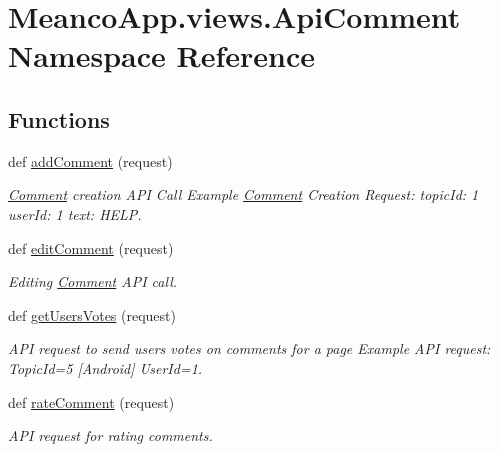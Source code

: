 \hypertarget{namespace_meanco_app_1_1views_1_1_api_comment}{}\section{Meanco\+App.\+views.\+Api\+Comment Namespace Reference}
\label{namespace_meanco_app_1_1views_1_1_api_comment}
\subsection*{Functions}
\begin{DoxyCompactItemize}
\item 
\hypertarget{namespace_meanco_app_1_1views_1_1_api_comment_a3005a6ae0564f801e722f039634f2465}{}\label{namespace_meanco_app_1_1views_1_1_api_comment_a3005a6ae0564f801e722f039634f2465} 
def \hyperlink{namespace_meanco_app_1_1views_1_1_api_comment_a3005a6ae0564f801e722f039634f2465}{add\+Comment} (request)
\begin{DoxyCompactList}\small\item\em \hyperlink{namespace_meanco_app_1_1views_1_1_comment}{Comment} creation A\+PI Call Example \hyperlink{namespace_meanco_app_1_1views_1_1_comment}{Comment} Creation Request\+: topic\+Id\+: 1 user\+Id\+: 1 text\+: H\+E\+LP. \end{DoxyCompactList}\item 
def \hyperlink{namespace_meanco_app_1_1views_1_1_api_comment_a611c3862a4a6724455998ef774e1f615}{edit\+Comment} (request)
\begin{DoxyCompactList}\small\item\em Editing \hyperlink{namespace_meanco_app_1_1views_1_1_comment}{Comment} A\+PI call. \end{DoxyCompactList}\item 
\hypertarget{namespace_meanco_app_1_1views_1_1_api_comment_a9395d617b26a517df88d0f36ebc45170}{}\label{namespace_meanco_app_1_1views_1_1_api_comment_a9395d617b26a517df88d0f36ebc45170} 
def \hyperlink{namespace_meanco_app_1_1views_1_1_api_comment_a9395d617b26a517df88d0f36ebc45170}{get\+Users\+Votes} (request)
\begin{DoxyCompactList}\small\item\em A\+PI request to send users votes on comments for a page Example A\+PI request\+: Topic\+Id=5 \mbox{[}Android\mbox{]} User\+Id=1. \end{DoxyCompactList}\item 
def \hyperlink{namespace_meanco_app_1_1views_1_1_api_comment_a3126e77b21099a4dd4dea0c7d5370b50}{rate\+Comment} (request)
\begin{DoxyCompactList}\small\item\em A\+PI request for rating comments. \end{DoxyCompactList}\end{DoxyCompactItemize}


